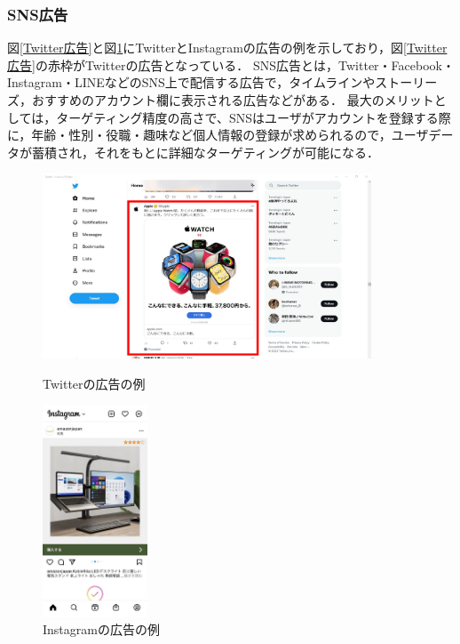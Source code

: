 \documentclass[12pt,a4j,titlepage]{ltjsarticle}
\begin{document}
\subsubsection{SNS広告}
図\ref{Twitter広告}と図\ref{Instagram広告}にTwitterとInstagramの広告の例を示しており，図\ref{Twitter広告}の赤枠がTwitterの広告となっている．
SNS広告とは，Twitter・Facebook・Instagram・LINEなどのSNS上で配信する広告で，タイムラインやストーリーズ，おすすめのアカウント欄に表示される広告などがある\cite{SNS}．
最大のメリットとしては，ターゲティング精度の高さで、SNSはユーザがアカウントを登録する際に，年齢・性別・役職・趣味など個人情報の登録が求められるので，ユーザデータが蓄積され，それをもとに詳細なターゲティングが可能になる．

\begin{figure}[htbp]
  \begin{minipage}[b]{0.50\linewidth}
    \centering
    \includegraphics[height=55mm]{figures/Twitter広告.pdf}
    \caption{Twitterの広告の例}
    \label{Twitter広告}
  \end{minipage}
  \begin{minipage}[b]{0.50\linewidth}
    \centering
    \includegraphics[height=63mm]{figures/Instagram広告.pdf}
    \caption{Instagramの広告の例}
    \label{Instagram広告}
  \end{minipage}
\end{figure}
\end{document}
